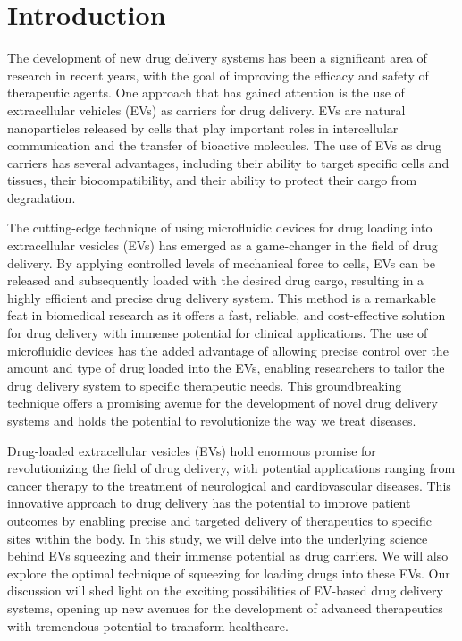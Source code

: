 \chapter{Introduction}

The development of new drug delivery systems has been a significant area of research in recent years, with the goal of improving the efficacy and safety of therapeutic agents. One approach that has gained attention is the use of extracellular vehicles (EVs) as carriers for drug delivery. EVs are natural nanoparticles released by cells that play important roles in intercellular communication and the transfer of bioactive molecules. The use of EVs as drug carriers has several advantages, including their ability to target specific cells and tissues, their biocompatibility, and their ability to protect their cargo from degradation.

The cutting-edge technique of using microfluidic devices for drug loading into extracellular vesicles (EVs) has emerged as a game-changer in the field of drug delivery. By applying controlled levels of mechanical force to cells, EVs can be released and subsequently loaded with the desired drug cargo, resulting in a highly efficient and precise drug delivery system. This method is a remarkable feat in biomedical research as it offers a fast, reliable, and cost-effective solution for drug delivery with immense potential for clinical applications. The use of microfluidic devices has the added advantage of allowing precise control over the amount and type of drug loaded into the EVs, enabling researchers to tailor the drug delivery system to specific therapeutic needs. This groundbreaking technique offers a promising avenue for the development of novel drug delivery systems and holds the potential to revolutionize the way we treat diseases.

Drug-loaded extracellular vesicles (EVs) hold enormous promise for revolutionizing the field of drug delivery, with potential applications ranging from cancer therapy to the treatment of neurological and cardiovascular diseases. This innovative approach to drug delivery has the potential to improve patient outcomes by enabling precise and targeted delivery of therapeutics to specific sites within the body. In this study, we will delve into the underlying science behind EVs squeezing and their immense potential as drug carriers. We will also explore the optimal technique of squeezing for loading drugs into these EVs. Our discussion will shed light on the exciting possibilities of EV-based drug delivery systems, opening up new avenues for the development of advanced therapeutics with tremendous potential to transform healthcare.

